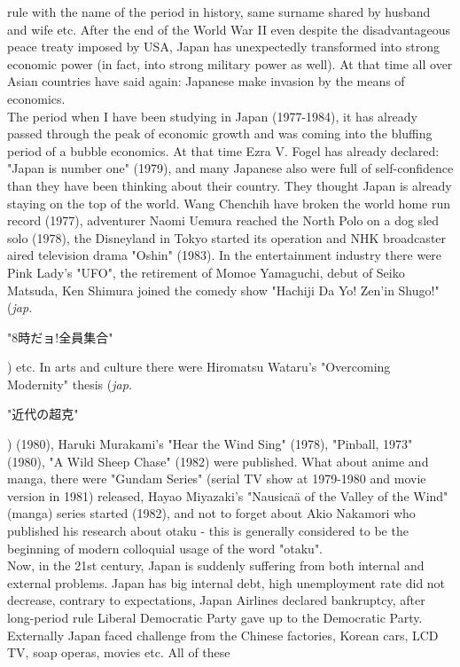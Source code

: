 \documentclass[11pt]{book}
\begin{document}
rule with the name of the period in history, same surname shared by husband and wife etc. After the end of the World War II even despite the
disadvantageous peace treaty imposed by USA, Japan has unexpectedly transformed into strong economic power (in fact, into strong military power
as well). At that time all over Asian countries have said again: Japanese make invasion by the means of economics.\\
The period when I have been studying in  Japan (1977-1984), it has already passed through the peak of economic growth and was coming into the 
bluffing period of a bubble economics. At that time Ezra V. Fogel has already declared: "Japan is number one" (1979),
and many Japanese also were full
of self-confidence than they have been thinking about their country. They thought Japan is already staying on the top of the world. Wang Chenchih
have broken the world home run record (1977), adventurer Naomi Uemura reached the North Polo on a dog sled solo (1978), the Disneyland in Tokyo
started its operation and NHK broadcaster aired television drama "Oshin" (1983). In the entertainment industry there were
Pink Lady's "UFO", the retirement of Momoe Yamaguchi, debut of Seiko Matsuda, Ken Shimura joined the comedy show "Hachiji Da Yo! Zen'in Shugo!"
(\textit{jap.}
\begin{CJK*}{UTF8}{min}"8時だョ!全員集合"\end{CJK*}
) etc. In arts and culture there were Hiromatsu Wataru's "Overcoming Modernity" thesis (\textit{jap.}
\begin{CJK*}{UTF8}{min}"近代の超克"\end{CJK*}) (1980), Haruki Murakami's "Hear the Wind Sing" (1978), "Pinball, 1973" (1980), "A Wild Sheep Chase"
(1982) were published. What about anime and manga, there were "Gundam Series" (serial TV show at 1979-1980 and movie version in 1981) 
released, Hayao Miyazaki's "Nausica\"a of the Valley of the Wind" (manga) series started (1982), and not to forget about Akio Nakamori
who published his research about otaku - this is generally considered to be the beginning of modern colloquial usage of the word "otaku".\\
Now, in the 21st century, Japan is suddenly suffering from both internal and external problems. Japan has big internal debt, high unemployment
rate did not decrease, contrary to expectations, Japan Airlines declared bankruptcy, after long-period rule Liberal Democratic Party gave up to
the Democratic Party. Externally Japan faced challenge from the Chinese factories, Korean cars, LCD TV, soap operas, movies etc. All of these
\end{document}
